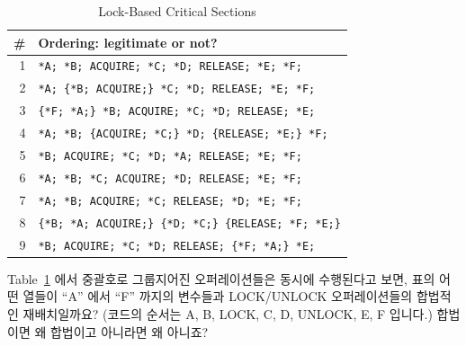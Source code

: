 \begin{enumerate}
\begin{table}[htbp]
\scriptsize\centering
\begin{tabular}{r|l}
  \# & Ordering: legitimate or not? \\
  \hline
  \hline
  1 & \verb|*A; *B; ACQUIRE; *C; *D; RELEASE; *E; *F;| \\
  \hline
  2 & \verb|*A; {*B; ACQUIRE;} *C; *D; RELEASE; *E; *F;| \\
  \hline
  3 & \verb|{*F; *A;} *B; ACQUIRE; *C; *D; RELEASE; *E;| \\
  \hline
  4 & \verb|*A; *B; {ACQUIRE; *C;} *D; {RELEASE; *E;} *F;| \\
  \hline
  5 & \verb|*B; ACQUIRE; *C; *D; *A; RELEASE; *E; *F;| \\
  \hline
  6 & \verb|*A; *B; *C; ACQUIRE; *D; RELEASE; *E; *F;| \\
  \hline
  7 & \verb|*A; *B; ACQUIRE; *C; RELEASE; *D; *E; *F;| \\
  \hline
  8 & \verb|{*B; *A; ACQUIRE;} {*D; *C;} {RELEASE; *F; *E;}| \\
  \hline
  9 & \verb|*B; ACQUIRE; *C; *D; RELEASE; {*F; *A;} *E;| \\
\end{tabular}
\caption{Lock-Based Critical Sections}
\label{tab:advsync:Lock-Based Critical Sections}
\end{table}

\QuickQuiz{}
	Table~\ref{tab:advsync:Lock-Based Critical Sections} 에서 중괄호로
	그룹지어진 오퍼레이션들은 동시에 수행된다고 보면, 표의 어떤 열들이
	``A'' 에서 ``F'' 까지의 변수들과 LOCK/UNLOCK 오퍼레이션들의 합법적인
	재배치일까요?
	(코드의 순서는 A, B, LOCK, C, D, UNLOCK, E, F 입니다.)
	합법이면 왜 합법이고 아니라면 왜 아니죠?
	\iffalse


\end{enumerate}
